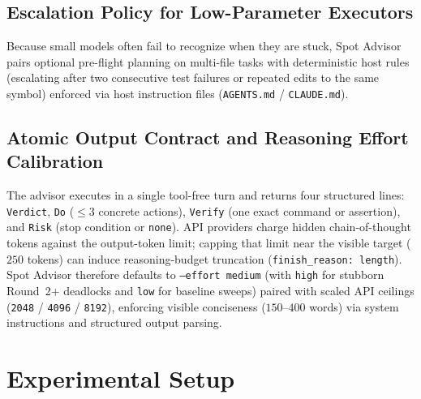 \documentclass[11pt]{article}
\begin{document}
\subsection{Escalation Policy for Low-Parameter Executors}
Because small models often fail to recognize when they are stuck, Spot Advisor pairs optional pre-flight planning on multi-file tasks with deterministic host rules (escalating after two consecutive test failures or repeated edits to the same symbol) enforced via host instruction files (\texttt{AGENTS.md} / \texttt{CLAUDE.md}).

\subsection{Atomic Output Contract and Reasoning Effort Calibration}
The advisor executes in a single tool-free turn and returns four structured lines: \texttt{Verdict}, \texttt{Do} ($\le 3$ concrete actions), \texttt{Verify} (one exact command or assertion), and \texttt{Risk} (stop condition or \texttt{none}). API providers charge hidden chain-of-thought tokens against the output-token limit; capping that limit near the visible target ($250$ tokens) can induce reasoning-budget truncation (\texttt{finish\_reason: length}). Spot Advisor therefore defaults to \texttt{--effort medium} (with \texttt{high} for stubborn Round~2+ deadlocks and \texttt{low} for baseline sweeps) paired with scaled API ceilings (\texttt{2048} / \texttt{4096} / \texttt{8192}), enforcing visible conciseness ($150\text{--}400$ words) via system instructions and structured output parsing.

\section{Experimental Setup}
\label{sec:setup}
\end{document}
